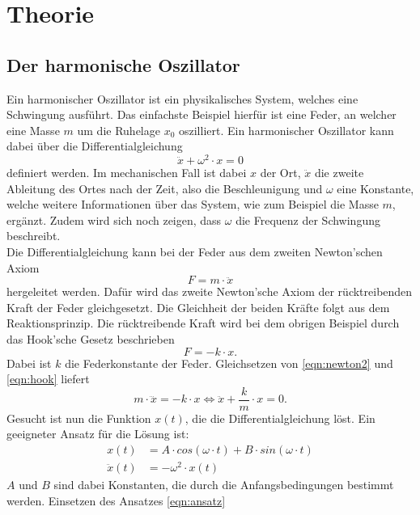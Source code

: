 \section{Theorie}
\label{sec:Theorie}
\subsection{Der harmonische Oszillator}
Ein harmonischer Oszillator ist ein physikalisches System, welches eine Schwingung ausführt. Das einfachste Beispiel
hierfür ist eine Feder, an welcher eine Masse  $m$ um die Ruhelage $x_0$ oszilliert.
Ein harmonischer Oszillator kann dabei über die Differentialgleichung
\begin{equation}
    \ddot{x}+\omega^2\cdot x=0 \label{eqn:harmOsz}
\end{equation}
definiert werden. Im mechanischen Fall ist dabei $x$ der Ort, $\ddot{x}$ die zweite Ableitung des Ortes nach der Zeit,
also die Beschleunigung und $\omega$ eine Konstante, welche weitere Informationen über das System, wie zum Beispiel die
Masse $m$, ergänzt. Zudem wird sich noch zeigen, dass $\omega$ die Frequenz der Schwingung beschreibt.
\\
Die Differentialgleichung kann bei der Feder aus dem zweiten Newton'schen Axiom
\begin{equation}
    F=m\cdot\ddot{x} \label{eqn:newton2}
\end{equation}
hergeleitet werden. Dafür wird das zweite Newton'sche Axiom der rücktreibenden Kraft der Feder gleichgesetzt. Die
Gleichheit der beiden Kräfte folgt aus dem Reaktionsprinzip. Die rücktreibende Kraft wird bei dem obrigen Beispiel
durch das Hook'sche Gesetz beschrieben
\begin{equation}
    F=-k\cdot x \label{eqn:hook}.
\end{equation}
Dabei ist $k$ die Federkonstante der Feder.
Gleichsetzen von \eqref{eqn:newton2} und \eqref{eqn:hook} liefert
\begin{equation}
    m\cdot\dddot{x}=-k\cdot x \Leftrightarrow \ddot{x}+\frac{k}{m}\cdot x=0 \label{eqn:dgl}.
\end{equation}
Gesucht ist nun die Funktion $x(t)$, die die Differentialgleichung löst. Ein geeigneter Ansatz für die Lösung ist:
\begin{align}
    x(t)&=A\cdot cos(\omega\cdot t)+B\cdot sin(\omega\cdot t) \\
    \ddot{x}(t)&=-\omega^2\cdot x(t)
    \label{eqn:ansatz}
\end{align}
$A$ und $B$ sind dabei Konstanten, die durch die Anfangsbedingungen bestimmt werden. Einsetzen des Ansatzes \eqref{eqn:ansatz}
